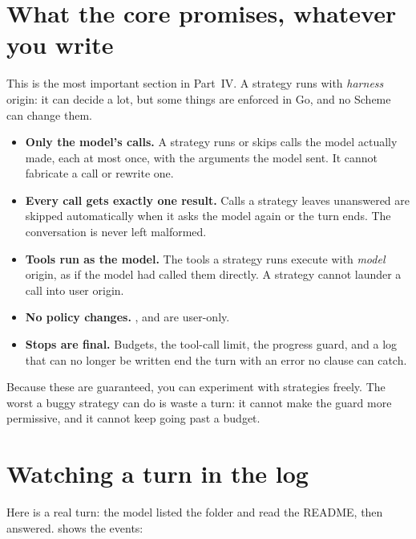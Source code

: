 \section{What the core promises, whatever you write}

This is the most important section in Part~IV. A strategy runs with
\emph{harness} origin: it can decide a lot, but some things are enforced in
Go, and no Scheme can change them.

\begin{itemize}
  \item \textbf{Only the model's calls.} A strategy runs or skips calls the
    model actually made, each at most once, with the arguments the model
    sent. It cannot fabricate a call or rewrite one.
  \item \textbf{Every call gets exactly one result.} Calls a strategy leaves
    unanswered are skipped automatically when it asks the model again or
    the turn ends. The conversation is never left malformed.
  \item \textbf{Tools run as the model.} The tools a strategy runs execute
    with \emph{model} origin, as if the model had called them directly. A
    strategy cannot launder a call into user origin.
  \item \textbf{No policy changes.} ,  and
     are user-only.
  \item \textbf{Stops are final.} Budgets, the tool-call limit, the progress
    guard, and a log that can no longer be written end the turn with an
    error no  clause can catch.
\end{itemize}

\begin{tip}
Because these are guaranteed, you can experiment with strategies freely.
The worst a buggy strategy can do is waste a turn: it cannot make the guard
more permissive, and it cannot keep going past a budget.
\end{tip}

\section{Watching a turn in the log}

Here is a real turn: the model listed the folder and read the README, then
answered.  shows the events:

